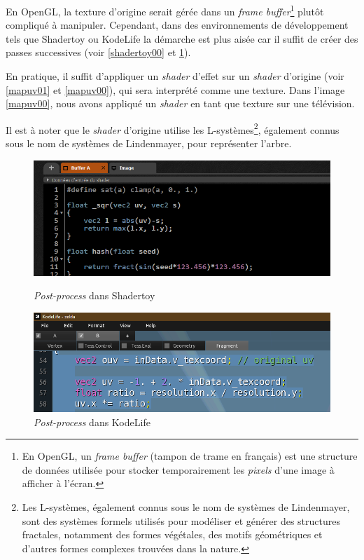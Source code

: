 En OpenGL, la texture d'origine serait gérée dans un \textit{frame buffer}\footnote{En OpenGL, un \textit{frame buffer} (tampon de trame en français) est une structure de données utilisée pour stocker temporairement les \textit{pixels} d'une image à afficher à l'écran.} plutôt compliqué à manipuler. Cependant, dans des environnements de développement tels que Shadertoy ou KodeLife la démarche est plus aisée car il suffit de créer des passes successives (voir \ref{shadertoy00} et \ref{kodelife000}).

En pratique, il suffit d'appliquer un \textit{shader} d'effet sur un \textit{shader} d'origine (voir \ref{mapuv01} et \ref{mapuv00}), qui sera interprété comme une texture. Dans l'image \ref{mapuv00}, nous avons appliqué un \textit{shader} en tant que texture sur une télévision. 

\newpage
Il est à noter que le \textit{shader} d'origine utilise les L-systèmes\footnote{Les L-systèmes, également connus sous le nom de systèmes de Lindenmayer, 
sont des systèmes formels utilisés pour modéliser et générer des structures fractales, notamment des formes végétales, des motifs géométriques et d'autres formes complexes trouvées dans la nature.}, également connus sous le nom de systèmes de Lindenmayer, pour représenter l'arbre. 

\begin{figure}[h]
  \begin{minipage}[b]{0.45\linewidth}
    \centering
    \includegraphics[width=\linewidth]{images/shaders/shadertoy00.png}
    \caption{\textit{Post-process} dans Shadertoy}
    \label{shadertoy00}
  \end{minipage}
  \hspace{0.1\linewidth} %
  \begin{minipage}[b]{0.45\linewidth}
    \centering
    \includegraphics[width=\linewidth]{images/shaders/kodelife00.png}
    \caption{\textit{Post-process} dans KodeLife}
    \label{kodelife000}
  \end{minipage}
\end{figure}

